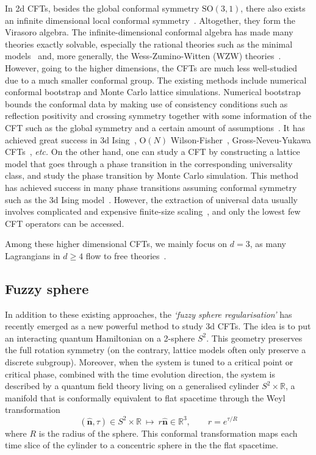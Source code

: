 \documentclass{timesjhep}
\begin{document}
In 2d CFTs, besides the global conformal symmetry $\mathrm{SO}(3,1)$, there also exists an infinite dimensional local conformal symmetry~\cite{DiFrancesco1997CFT,Ginsparg1988CFT}. Altogether, they form the Virasoro algebra. The infinite-dimensional conformal algebra has made many theories exactly solvable, especially the rational theories such as the minimal models~\cite{Belavin1984BPZ} and, more generally, the Wess-Zumino-Witten (WZW) theories~\cite{Wess1971WZW,Witten1983WZW}. However, going to the higher dimensions, the CFTs are much less well-studied due to a much smaller conformal group. The existing methods include numerical conformal bootstrap and Monte Carlo lattice simulations. Numerical bootstrap bounds the conformal data by making use of consistency conditions such as reflection positivity and crossing symmetry together with some information of the CFT such as the global symmetry and a certain amount of assumptions~\cite{Poland2018Bootstrap,Rychkov2023Bootstrap}. It has achieved great success in 3d Ising~\cite{ElShowk2012Ising,Kos2016Ising}, $\mathrm{O}(N)$ Wilson-Fisher~\cite{Kos2015ON,Kos2016Ising}, Gross-Neveu-Yukawa CFTs~\cite{Iliesiu2015GNY}, \textit{etc.} On the other hand, one can study a CFT by constructing a lattice model that goes through a phase transition in the corresponding universality class, and study the phase transition by Monte Carlo simulation. This method has achieved success in many phase transitions assuming conformal symmetry such as the 3d Ising model~\cite{Ferrenberg2018IsingMC}. However, the extraction of universal data usually involves complicated and expensive finite-size scaling~\cite{Cardy1996Scaling,Sandvik2010FSS,Fisher1972FSS}, and only the lowest few CFT operators can be accessed. 

Among these higher dimensional CFTs, we mainly focus on $d=3$, as many Lagrangians in $d\ge 4$ flow to free theories~\cite{Sachdev2011Quantum}. 

\subsection{Fuzzy sphere}

In addition to these existing approaches, the \emph{`fuzzy sphere regularisation'} has recently emerged as a new powerful method to study 3d CFTs. The idea is to put an interacting quantum Hamiltonian on a 2-sphere $S^2$. This geometry preserves the full rotation symmetry (on the contrary, lattice models often only preserve a discrete subgroup). Moreover, when the system is tuned to a critical point or critical phase, combined with the time evolution direction, the system is described by a quantum field theory living on a generalised cylinder $S^2\times\mathbb{R}$, a manifold that is conformally equivalent to flat spacetime through the Weyl transformation
\begin{equation}
    (\hat{\mathbf{n}},\tau)\in S^2\times\mathbb{R}\ \longmapsto\ r\hat{\mathbf{n}}\in\mathbb{R}^3,\qquad r=e^{\tau/R}
\end{equation}
where $R$ is the radius of the sphere. This conformal transformation maps each time slice of the cylinder to a concentric sphere in the the flat spacetime. 
\end{document}

